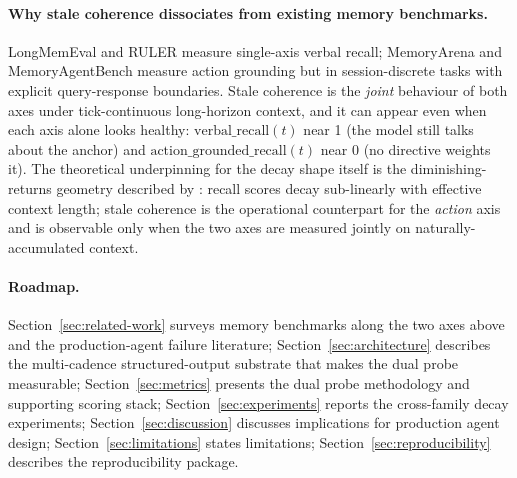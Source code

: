 \paragraph{Why stale coherence dissociates from existing memory benchmarks.}
LongMemEval and RULER measure single-axis verbal recall; MemoryArena and
MemoryAgentBench measure action grounding but in session-discrete tasks with
explicit query-response boundaries. Stale coherence is the \emph{joint}
behaviour of both axes under tick-continuous long-horizon context, and it can
appear even when each axis alone looks healthy:
$\text{verbal\_recall}(t)$ near 1 (the model still talks about the anchor) and
$\text{action\_grounded\_recall}(t)$ near 0 (no directive weights it). The
theoretical underpinning for the decay shape itself is the diminishing-returns
geometry described by \citet{Sinha2025IllusionDiminishingReturns}: recall
scores decay sub-linearly with effective context length; stale coherence is
the operational counterpart for the \emph{action} axis and is observable only
when the two axes are measured jointly on naturally-accumulated context.

\paragraph{Roadmap.}
Section~\ref{sec:related-work} surveys memory benchmarks along the two axes
above and the production-agent failure literature;
Section~\ref{sec:architecture} describes the multi-cadence structured-output
substrate that makes the dual probe measurable;
Section~\ref{sec:metrics} presents the dual probe methodology and supporting
scoring stack;
Section~\ref{sec:experiments} reports the cross-family decay experiments;
Section~\ref{sec:discussion} discusses implications for production agent
design;
Section~\ref{sec:limitations} states limitations;
Section~\ref{sec:reproducibility} describes the reproducibility package.
